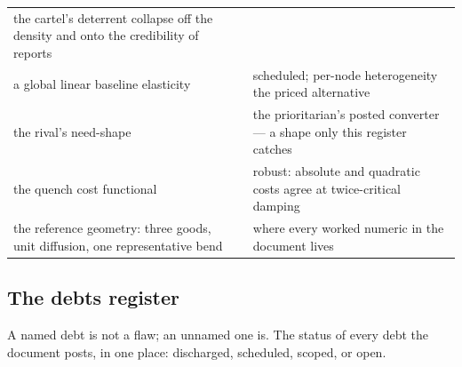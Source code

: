 \documentclass[../main]{subfiles}
\begin{document}
\begin{table}[htbp]
\begin{tabularx}{\textwidth}{@{} >{\hsize}L l >{\hsize}L @{}}
        the cartel's deterrent collapse off the density and onto the
        credibility of reports \\
    \addlinespace
    a global linear baseline elasticity & 
      & scheduled; per-node heterogeneity the priced alternative \\
    \addlinespace
    the rival's need-shape & 
      & the prioritarian's posted converter --- a shape only this register
        catches \\
    \addlinespace
    the quench cost functional & 
      & robust: absolute and quadratic costs agree at twice-critical
        damping \\
    \addlinespace
    the reference geometry: three goods, unit diffusion, one representative
      bend & 
      & where every worked numeric in the document lives \\
    \bottomrule
  \end{tabularx}
\end{table}

\subsection{The debts register}
\label{subsec:ledger:debts}
A named debt is not a flaw; an unnamed one is. The status of every debt the document
posts, in one place: discharged, scheduled, scoped, or open.
\end{document}
